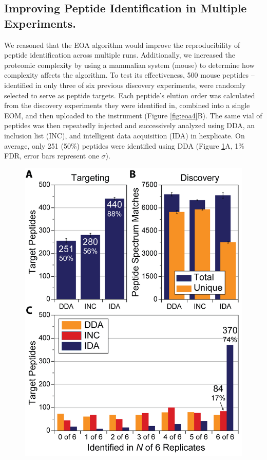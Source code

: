 \subsection*{Improving Peptide Identification in Multiple Experiments.}

We reasoned that the EOA algorithm would improve the reproducibility of peptide identification across multiple runs. Additionally, we increased the proteomic complexity by using a mammalian system (mouse) to determine how complexity affects the algorithm. To test its effectiveness, 500 mouse peptides -- identified in only three of six previous discovery experiments, were randomly selected to serve as peptide targets. Each peptide's elution order was calculated from the discovery experiments they were identified in, combined into a single EOM, and then uploaded to the instrument (Figure \ref{fig:eoa4}B). The same vial of peptides was then repeatedly injected and successively analyzed using DDA, an inclusion list (INC), and intelligent data acquisition (IDA) in hexplicate. On average, only 251 (50\%) peptides were identified using DDA (Figure \ref{fig:eoa5}A, 1\% FDR, error bars represent one $\sigma$).
\begin{figure}[p]
	\centering
	\includegraphics[width=0.75\columnwidth]{eoa/EOA 5.png}
	\label{fig:eoa5}
\end{figure}  
